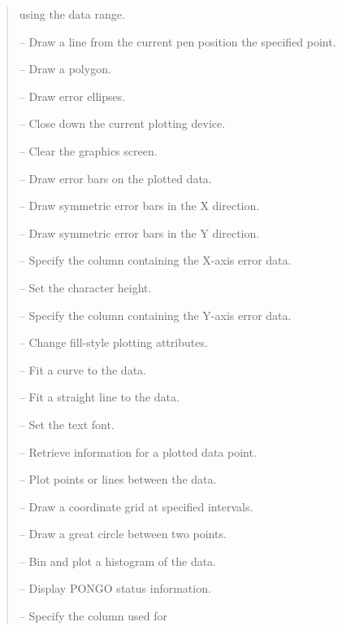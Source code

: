 \documentclass[twoside,11pt]{article}
\newcommand{\htmlref}[2]{#1}
\renewcommand{\_}{\texttt{\symbol{95}}}
\newcommand{\iref} [1]{\htmlref{#1}{#1}}
\newcommand{\iiref}[2]{\htmlref{#1}{#2}}
\begin{document}
\begin {quote}
\begin {description}
                                             using the data range.
\item [\iref{DRAW}] -- Draw a line from the current pen position the specified
                       point.
\item [\iref{DRAWPOLY}] -- Draw a polygon.
\item [\iref{ELLIPSES}] -- Draw error ellipses.
\item [\iiref{ENDP(LOT)}{ENDPLOT}] -- Close down the current plotting device.
\item [\iref{ERASE}] -- Clear the graphics screen.
\item [\iref{ERRORBAR}] -- Draw error bars on the plotted data.
\item [\iref{ERRX}] -- Draw symmetric error bars in the X direction.
\item [\iref{ERRY}] -- Draw symmetric error bars in the Y direction.
\item [\iiref{EXC(OLUMN)}{EXCOLUMN}] -- Specify the column containing
                                        the X-axis error data.
\item [\iiref{EXPA(ND)}{EXPAND}] -- Set the character height.
\item [\iiref{EYC(OLUMN)}{EYCOLUMN}] -- Specify the column containing
                                        the Y-axis error data.
\item [\iref{FILLSTY}] -- Change fill-style plotting attributes.
\item [\iiref{FITC(URVE)}{FITCURVE}] -- Fit a curve to the data.
\item [\iiref{FITL(INE)}{FITLINE}] -- Fit a straight line to the data.
\item [\iref{FONT}] -- Set the text font.
\item [\iiref{GETP(OINT)}{GETPOINT}] -- Retrieve information for a
                                        plotted data point.
\item [\iref{GPOINTS}] -- Plot points or lines between the data.
\item [\iref{GRID}] -- Draw a coordinate grid at specified intervals.
\item [\iref{GT\_CIRCLE}] -- Draw a great circle between two points.
\item [\iiref{HIST(OGRAM)}{HISTOGRAM}] -- Bin and plot a histogram of
                                          the data.
\item [\iiref{INQ(UIRE)}{INQUIRE}] -- Display PONGO status information.
\item [\iiref{LABC(OLUMN)}{LABCOLUMN}] -- Specify the column used for

\end{description}
\end{quote}
\end{document}
